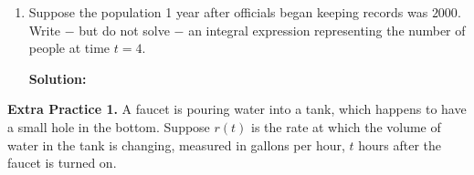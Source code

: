 \documentclass[10pt]{article}
\newcommand{\solution}{%
  \vspace{0.2in}%
  \noindent\textbf{\color{blue}Solution: }%
}
\begin{document}
\begin{enumerate}
\solution




\item[(c)] Suppose the population 1 year after officials began keeping records was $2000$. Write $-$ but do not solve $-$ an integral expression representing the number of people at time $t=4$.

\solution
\blue{
\[
P(4) = 2000 + \int_1^4 f(t)\, dt
\]
}
\end{enumerate}

\newpage
{\bf\color{blue}Extra Practice 1.} A faucet is pouring water into a tank, which happens to have a small hole in the bottom. Suppose $r(t)$ is the rate at which the volume of water in the tank is changing, measured in gallons per hour, $t$ hours after the faucet is turned on.
\end{document}
